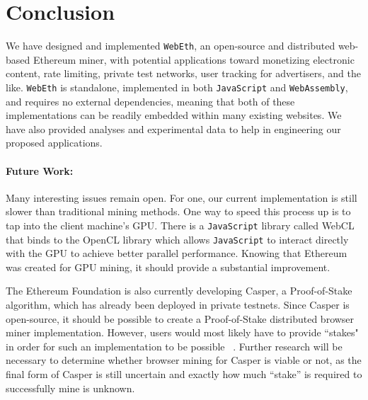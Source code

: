\documentclass[runningheads]{llncs}
\begin{document}
\section{Conclusion}
\label{sec:conclusion}
We have designed and implemented \verb|WebEth|, an open-source and  distributed web-based Ethereum miner, with potential applications toward monetizing electronic content, rate limiting, private test networks, user tracking for advertisers, and the like. \verb|WebEth| is standalone, implemented in both \verb|JavaScript| and \verb|WebAssembly|, and requires no external dependencies, meaning that both of these implementations can be readily embedded within many existing websites.  We have also provided analyses and experimental data to help in engineering our proposed applications.


\paragraph{Future Work:}
Many interesting issues remain open.  For one, our current implementation is still slower than traditional mining methods. One way to speed this process up is to tap into the client machine's GPU. There is a \verb|JavaScript| library called WebCL that binds to the OpenCL library which allows \verb|JavaScript| to interact directly with the GPU to achieve better parallel performance. Knowing that Ethereum was created for GPU mining, it should provide a substantial improvement. 

The Ethereum Foundation is also currently developing Casper, a Proof-of-Stake algorithm, which has already been deployed in private testnets. Since Casper is open-source, it should be possible to create a Proof-of-Stake distributed browser miner implementation. However, users would most likely have to provide ``stakes" in order for such an implementation to be possible ~\cite{PoSproof}. Further research will be necessary to determine whether browser mining for Casper is viable or not, as the final form of Casper is still uncertain and exactly how much ``stake'' is required to successfully mine is unknown.


\end{document}
